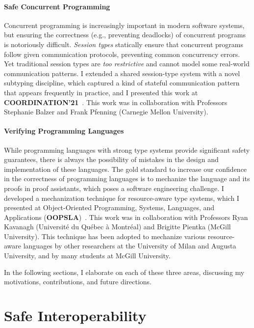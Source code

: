 \documentclass[11pt]{article}
\begin{document}
\paragraph{Safe Concurrent Programming}
Concurrent programming is increasingly important in modern software systems, but ensuring the correctness (e.g., preventing deadlocks) of concurrent programs is notoriously difficult.
\emph{Session types} statically ensure that concurrent programs follow given communication protocols, preventing common concurrency errors.
Yet traditional session types are \emph{too restrictive} and cannot model some real-world communication patterns.
I extended a shared session-type system with a novel subtyping discipline, which captured a kind of stateful communication pattern that appears frequently in practice, and I presented this work at \textbf{COORDINATION'21}~\cite{Sano21coordination}.
This work was in collaboration with
Professors Stephanie Balzer and Frank Pfenning
(Carnegie Mellon University).

\paragraph{Verifying Programming Languages}
While programming languages with strong type systems provide significant safety guarantees, there is always the possibility of mistakes in the design and implementation of these languages.
The gold standard to increase our confidence in the correctness of programming languages is to mechanize the language and its proofs in proof assistants, which poses a software engineering challenge.
I developed a mechanization technique for resource-aware type systems, which I presented at Object-Oriented Programming, Systems, Languages, and Applications (\textbf{OOPSLA})~\cite{Sano23oopsla}.
This work was in collaboration with
Professors Ryan Kavanagh (Université du Québec à Montréal) and
Brigitte Pientka (McGill University).
This technique has been adopted to mechanize various resource-aware languages by other researchers at the University of Milan and Augusta University, and by many students at McGill University.

In the following sections, I elaborate on each of these three areas, discussing my motivations, contributions, and future directions.

\section*{Safe Interoperability}
\end{document}
